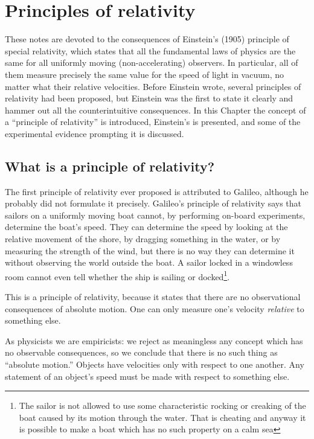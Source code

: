 \chapter{Principles of relativity}
\label{chap:principles}

These notes are devoted to the consequences of Einstein's (1905)
principle of special relativity, which states that all the fundamental
laws of physics are the same for all uniformly moving
(non-accelerating) observers.  In particular, all of them measure
precisely the same value for the speed of light in vacuum, no matter
what their relative velocities.  Before Einstein wrote, several
principles of relativity had been proposed, but Einstein was the first
to state it clearly and hammer out all the counterintuitive
consequences.  In this Chapter the concept of a ``principle of
relativity'' is introduced, Einstein's is presented, and some of the
experimental evidence prompting it is discussed.


\section{What is a principle of relativity?}
\label{sec:whatis}

The first principle of relativity ever proposed is attributed to
Galileo, although he probably did not formulate it precisely.
Galileo's principle of relativity says that sailors on a uniformly
moving boat cannot, by performing on-board experiments, determine the
boat's speed.  They can determine the speed by looking at the relative
movement of the shore, by dragging something in the water, or by
measuring the strength of the wind, but there is no way they can
determine it without observing the world outside the boat.  A sailor
locked in a windowless room cannot even tell whether the ship is
sailing or docked\footnote{The sailor is not allowed to use some
characteristic rocking or creaking of the boat caused by its motion
through the water.  That is cheating and anyway it is possible to make
a boat which has no such property on a calm sea}.

This is a principle of relativity, because it states that there are no
observational consequences of absolute motion.  One can only measure
one's velocity {\em relative\/} to something else.

As physicists we are empiricists: we reject as meaningless any concept
which has no observable consequences, so we conclude that there is no
such thing as ``absolute motion.''  Objects have velocities only with
respect to one another.  Any statement of an object's speed must be
made with respect to something else.

